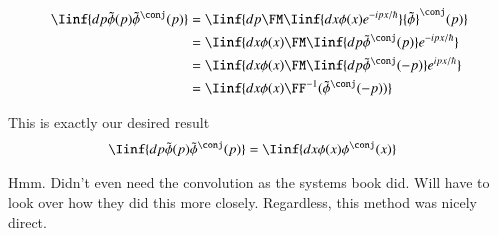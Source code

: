 \begin{align*}
\Iinf{ dp \tilde{\phi}(p){\tilde{\phi}}^\conj(p) } 
&= \Iinf{ dp \FM \Iinf{ dx \phi(x) e^{-ipx/\hbar}} {\tilde{\phi}}^\conj(p) }  \\
&= \Iinf{ dx \phi(x) \FM \Iinf{ dp {\tilde{\phi}}^\conj(p) } e^{-ipx/\hbar}} \\
&= \Iinf{ dx \phi(x) \FM \Iinf{ dp {\tilde{\phi}}^\conj(-p) } e^{ipx/\hbar}} \\
&= \Iinf{ dx \phi(x) \FF^{-1}( {\tilde{\phi}}^\conj(-p) )}  \\
\end{align*}

This is exactly our desired result
\begin{align*}
\Iinf{ dp \tilde{\phi}(p){\tilde{\phi}}^\conj(p) } &= 
\Iinf{ dx \phi(x) \phi^\conj(x)}
\end{align*}

Hmm.  Didn't even need the convolution as the systems book did.  Will have to look over how they did this more closely.  Regardless, this method was nicely direct.
